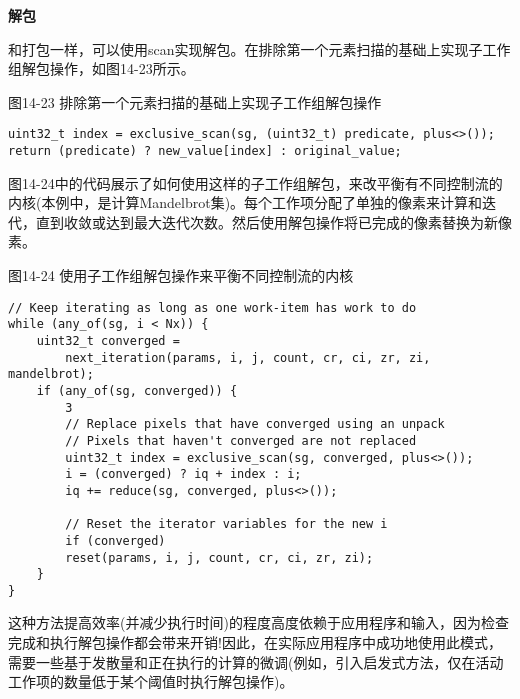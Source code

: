 \hspace*{\fill} \par %
\textbf{解包}

和打包一样，可以使用scan实现解包。在排除第一个元素扫描的基础上实现子工作组解包操作，如图14-23所示。\par

\hspace*{\fill} \par %
图14-23 排除第一个元素扫描的基础上实现子工作组解包操作
\begin{lstlisting}[caption={}]
uint32_t index = exclusive_scan(sg, (uint32_t) predicate, plus<>());
return (predicate) ? new_value[index] : original_value;
\end{lstlisting}

图14-24中的代码展示了如何使用这样的子工作组解包，来改平衡有不同控制流的内核(本例中，是计算Mandelbrot集)。每个工作项分配了单独的像素来计算和迭代，直到收敛或达到最大迭代次数。然后使用解包操作将已完成的像素替换为新像素。\par

\hspace*{\fill} \par %
图14-24 使用子工作组解包操作来平衡不同控制流的内核
\begin{lstlisting}[caption={}]
// Keep iterating as long as one work-item has work to do
while (any_of(sg, i < Nx)) {
	uint32_t converged =
		next_iteration(params, i, j, count, cr, ci, zr, zi, mandelbrot);
	if (any_of(sg, converged)) {
		3
		// Replace pixels that have converged using an unpack
		// Pixels that haven't converged are not replaced
		uint32_t index = exclusive_scan(sg, converged, plus<>());
		i = (converged) ? iq + index : i;
		iq += reduce(sg, converged, plus<>());
		
		// Reset the iterator variables for the new i
		if (converged)
		reset(params, i, j, count, cr, ci, zr, zi);
	}
}
\end{lstlisting}

这种方法提高效率(并减少执行时间)的程度高度依赖于应用程序和输入，因为检查完成和执行解包操作都会带来开销!因此，在实际应用程序中成功地使用此模式，需要一些基于发散量和正在执行的计算的微调(例如，引入启发式方法，仅在活动工作项的数量低于某个阈值时执行解包操作)。\par






















